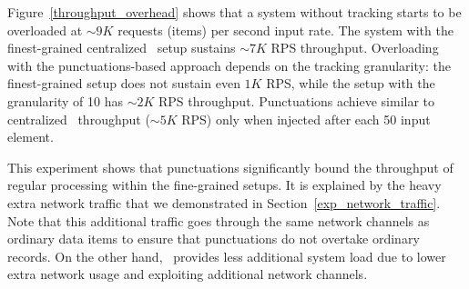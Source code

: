 Figure~\ref{throughput_overhead} shows that a system without tracking starts to be overloaded at $\sim 9K$ requests (items) per second input rate. The system with the finest-grained centralized \tracker\ setup sustains $\sim 7K$ RPS throughput. Overloading with the punctuations-based approach depends on the tracking granularity: the finest-grained setup does not sustain even $1K$ RPS, while the setup with the granularity of 10 has $\sim 2K$ RPS throughput. Punctuations achieve similar to centralized \tracker\ throughput ($\sim 5K$ RPS) only when injected after each 50 input element.

This experiment shows that punctuations significantly bound the throughput of regular processing within the fine-grained setups. It is explained by the heavy extra network traffic that we demonstrated in Section~\ref{exp_network_traffic}. Note that this additional traffic goes through the same network channels as ordinary data items to ensure that punctuations do not overtake ordinary records. On the other hand, \tracker\ provides less additional system load due to lower extra network usage and exploiting additional network channels.

